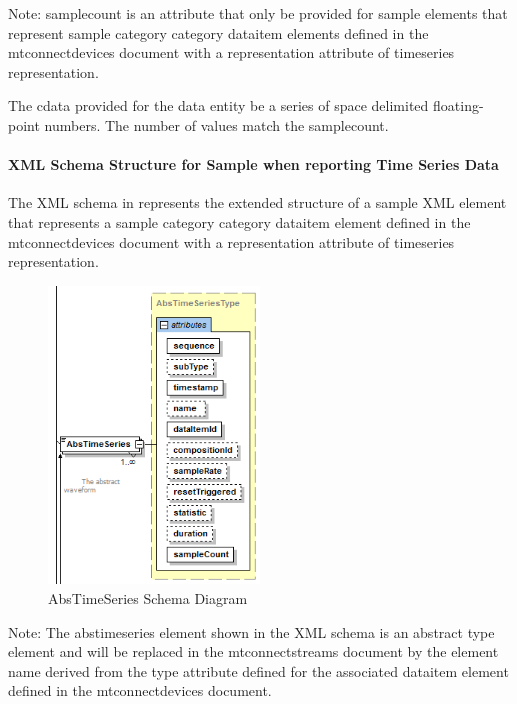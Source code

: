 \begin{note}
Note: \gls{samplecount} is an attribute that \must only be provided for \gls{sample} elements that represent \gls{sample category} category \gls{dataitem} elements defined in the \gls{mtconnectdevices} document with a \gls{representation} attribute of \gls{timeseries representation}.  

\end{note}

The \gls{cdata} provided for the \gls{data entity} \must be a series of space delimited floating-point numbers.  The number of values \must match the \gls{samplecount}.  

\paragraph{XML Schema Structure for Sample when reporting Time Series Data}\mbox{}

The XML schema in   represents the extended structure of a \gls{sample} XML element that represents a \gls{sample category} category \gls{dataitem} element defined in the \gls{mtconnectdevices} document with a \gls{representation} attribute of \gls{timeseries representation}. 

\begin{figure}[ht]
  \centering
  \includegraphics[width=0.5\textwidth]{figures/abstimeseries-schema-diagram.png}
  \caption{AbsTimeSeries Schema Diagram}
  \label{fig:abstimeseries-schema-diagram}
\end{figure}
\FloatBarrier

\begin{note}
Note: The \gls{abstimeseries} element shown in the XML schema is an abstract type element and will be replaced in the \gls{mtconnectstreams} document by the \gls{element name} derived from the \gls{type} attribute defined for the associated \gls{dataitem} element defined in the \gls{mtconnectdevices} document.

\end{note}

